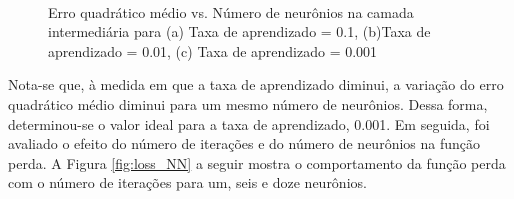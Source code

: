 \documentclass[brazil,tf,epusp]{usp}  %
\begin{document}
\begin{figure}[!h]
\hfill
{}\\
\caption{Erro quadrático médio vs. Número de neurônios na camada intermediária para (a) Taxa de aprendizado = 0.1, (b)Taxa de aprendizado = 0.01, (c) Taxa de aprendizado = 0.001}
\label{fig:test_NN}
\end{figure}

Nota-se que, à medida em que a taxa de aprendizado diminui, a variação do erro quadrático médio diminui para um mesmo número de neurônios. Dessa forma, determinou-se o valor ideal para a taxa de aprendizado, 0.001.
Em seguida, foi avaliado o efeito do número de iterações e do número de neurônios na função perda. A Figura \ref{fig:loss_NN} a seguir mostra o comportamento da função perda com o número de iterações para um, seis e doze neurônios.
\end{document}
